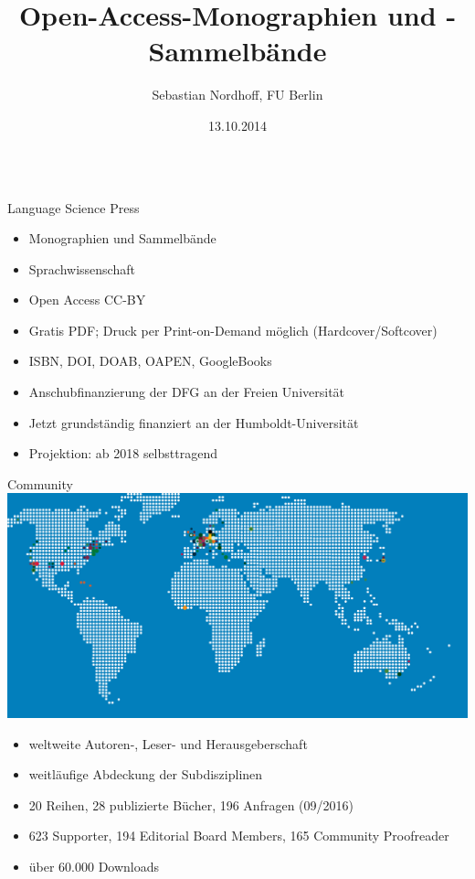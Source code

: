 \documentclass[final,utf8]{beamer}
\title{\Huge Open-Access-Monographien und -Sammelb\"ande}
\author{Sebastian Nordhoff, FU Berlin}
\institute[Language Science Press]{Language Science Press} %
\date{13.10.2014}
\begin{document}
\begin{frame}{} 
\vspace{-1cm}
\begin{columns}[t]
  \begin{column}{.45\linewidth}  
    \begin{block}{Language Science Press} 
	\begin{itemize}
	\item Monographien und Sammelb\"ande
	\item Sprachwissenschaft
	\item Open Access CC-BY
	\item Gratis PDF; Druck per Print-on-Demand m\"oglich (Hardcover/Softcover)
	\item ISBN, DOI, DOAB, OAPEN, GoogleBooks
	\item Anschubfinanzierung der DFG an der Freien Universit\"at 
	\item Jetzt grundst\"andig finanziert an der Humboldt-Universit\"at 
	\item Projektion: ab 2018 selbsttragend 
	\end{itemize} 
    \end{block}    

    \begin{block}{Community} 
\includegraphics[width=.9\textwidth]{WORLDMAPDOTSdots.png}
	\begin{itemize} 
	    \item weltweite Autoren-, Leser- und Herausgeberschaft
	    \item weitl\"aufige Abdeckung der Subdisziplinen
	    \item 20 Reihen, 28 publizierte B\"ucher, 196 Anfragen (09/2016)
	    \item 623 Supporter, 194 Editorial Board Members, 165 Community Proofreader
	    \item \"uber 60.000 Downloads
	\end{itemize}  
    \end{block} 



\end{column}
\end{columns}
\end{frame}
\end{document}
